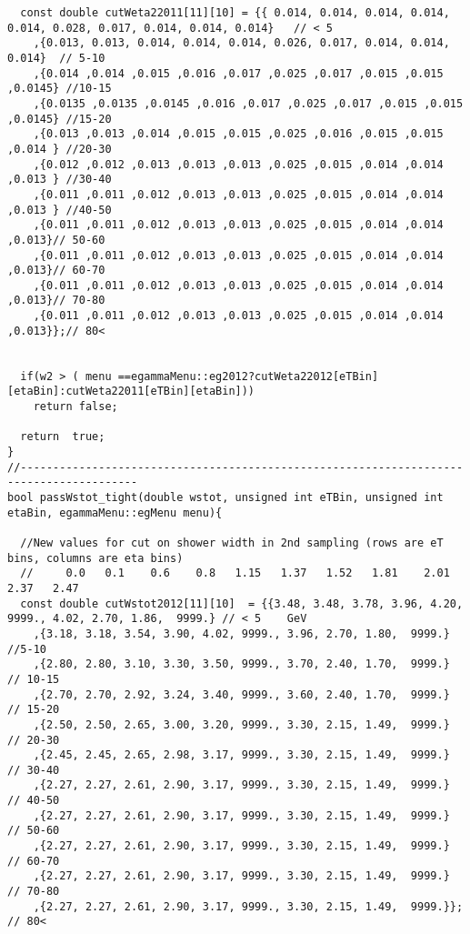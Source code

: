 \begin{lstlisting}
  const double cutWeta22011[11][10] = {{ 0.014, 0.014, 0.014, 0.014, 0.014, 0.028, 0.017, 0.014, 0.014, 0.014}   // < 5 
	,{0.013, 0.013, 0.014, 0.014, 0.014, 0.026, 0.017, 0.014, 0.014, 0.014}  // 5-10
	,{0.014 ,0.014 ,0.015 ,0.016 ,0.017 ,0.025 ,0.017 ,0.015 ,0.015 ,0.0145} //10-15
	,{0.0135 ,0.0135 ,0.0145 ,0.016 ,0.017 ,0.025 ,0.017 ,0.015 ,0.015 ,0.0145} //15-20
	,{0.013 ,0.013 ,0.014 ,0.015 ,0.015 ,0.025 ,0.016 ,0.015 ,0.015 ,0.014 } //20-30
	,{0.012 ,0.012 ,0.013 ,0.013 ,0.013 ,0.025 ,0.015 ,0.014 ,0.014 ,0.013 } //30-40
	,{0.011 ,0.011 ,0.012 ,0.013 ,0.013 ,0.025 ,0.015 ,0.014 ,0.014 ,0.013 } //40-50
	,{0.011 ,0.011 ,0.012 ,0.013 ,0.013 ,0.025 ,0.015 ,0.014 ,0.014 ,0.013}// 50-60
	,{0.011 ,0.011 ,0.012 ,0.013 ,0.013 ,0.025 ,0.015 ,0.014 ,0.014 ,0.013}// 60-70 
	,{0.011 ,0.011 ,0.012 ,0.013 ,0.013 ,0.025 ,0.015 ,0.014 ,0.014 ,0.013}// 70-80 
	,{0.011 ,0.011 ,0.012 ,0.013 ,0.013 ,0.025 ,0.015 ,0.014 ,0.014 ,0.013}};// 80<   


  if(w2 > ( menu ==egammaMenu::eg2012?cutWeta22012[eTBin][etaBin]:cutWeta22011[eTBin][etaBin]))
    return false;
          
  return  true;
}
//----------------------------------------------------------------------------------------
bool passWstot_tight(double wstot, unsigned int eTBin, unsigned int etaBin, egammaMenu::egMenu menu){
  
  //New values for cut on shower width in 2nd sampling (rows are eT bins, columns are eta bins)
  //     0.0   0.1    0.6    0.8   1.15   1.37   1.52   1.81    2.01   2.37   2.47
  const double cutWstot2012[11][10]  = {{3.48, 3.48, 3.78, 3.96, 4.20, 9999., 4.02, 2.70, 1.86,  9999.} // < 5    GeV
	,{3.18, 3.18, 3.54, 3.90, 4.02, 9999., 3.96, 2.70, 1.80,  9999.} //5-10   
	,{2.80, 2.80, 3.10, 3.30, 3.50, 9999., 3.70, 2.40, 1.70,  9999.} // 10-15 
	,{2.70, 2.70, 2.92, 3.24, 3.40, 9999., 3.60, 2.40, 1.70,  9999.} // 15-20 
	,{2.50, 2.50, 2.65, 3.00, 3.20, 9999., 3.30, 2.15, 1.49,  9999.} // 20-30  
	,{2.45, 2.45, 2.65, 2.98, 3.17, 9999., 3.30, 2.15, 1.49,  9999.} // 30-40  
	,{2.27, 2.27, 2.61, 2.90, 3.17, 9999., 3.30, 2.15, 1.49,  9999.} // 40-50  
	,{2.27, 2.27, 2.61, 2.90, 3.17, 9999., 3.30, 2.15, 1.49,  9999.} // 50-60  
	,{2.27, 2.27, 2.61, 2.90, 3.17, 9999., 3.30, 2.15, 1.49,  9999.} // 60-70  
	,{2.27, 2.27, 2.61, 2.90, 3.17, 9999., 3.30, 2.15, 1.49,  9999.} // 70-80  
	,{2.27, 2.27, 2.61, 2.90, 3.17, 9999., 3.30, 2.15, 1.49,  9999.}};  // 80<    
  

\end{lstlisting}
